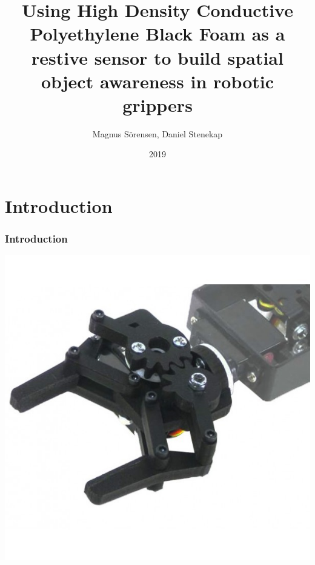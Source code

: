 \documentclass{beamer}
\title{Using High Density Conductive
Polyethylene Black Foam as a restive sensor to
build spatial object awareness in robotic grippers}
\author{Magnus Sörensen, Daniel Stenekap}
\institute{Märlardalens högskola}
\date{2019}
\begin{document}
\frame{\titlepage}



\section{Introduction}%
\label{sec:intro}

\begin{frame}
    \frametitle{Introduction}

    \begin{center}
        \includegraphics[width=.5\textwidth]{img/rob0078.jpg}
    \end{center}
\end{frame}
\end{document}

